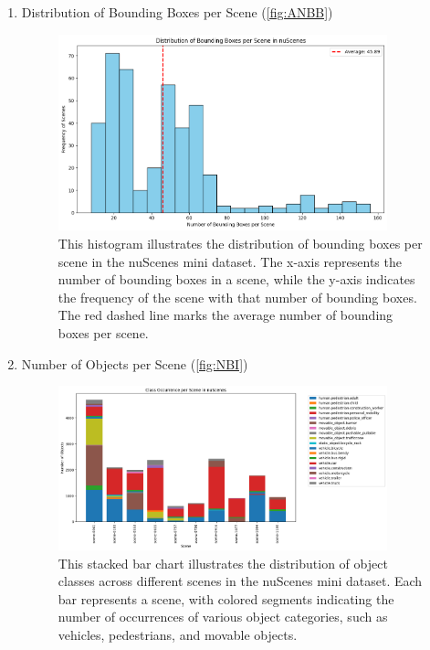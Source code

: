 \documentclass{article} %
\begin{document}
\begin{enumerate}
\begin{figure}[H]
			\label{fig:CD}
		\end{figure}
		\item Distribution of Bounding Boxes per Scene (\autoref{fig:ANBB})
		\begin{figure}[H]
			\centering
			\includegraphics[width=0.9\textwidth]{./Figures/nuscenes_Frequency_of_Scenes.png}
			\caption{This histogram illustrates the distribution of bounding boxes per scene in the nuScenes mini dataset. The x-axis represents the number of bounding boxes in a scene, while the y-axis indicates the frequency of the scene with that number of bounding boxes. The red dashed line marks the average number of bounding boxes per scene.}
			\label{fig:ANBB}
		\end{figure}
		\item Number of Objects per Scene (\autoref{fig:NBI})
		\begin{figure}[H]
			\centering
			\includegraphics[width=0.9\textwidth]{Figures/nuscenes_class_occurrence.png}
			\caption{This stacked bar chart illustrates the distribution of object classes across different scenes in the nuScenes mini dataset. Each bar represents a scene, with colored segments indicating the number of occurrences of various object categories, such as vehicles, pedestrians, and movable objects.}
			\label{fig:NBI}

\end{figure}
\end{enumerate}
\end{document}

